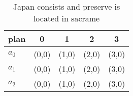 \documentclass[a4paper]{article}
\begin{document}
\begin{table}
\begin{adjustbox}{width=0.6\columnwidth}
\begin{tabular}{|l|l|l|l|l|}
\hline
\textbf{plan} & \multicolumn{1}{c|}{\textbf{0}} & \multicolumn{1}{c|}{\textbf{1}} & \multicolumn{1}{c|}{\textbf{2}} & \multicolumn{1}{c|}{\textbf{3}} \\ \hline
\textbf{$a_0$}  & (0,0) & (1,0) & (2,0) & (3,0) \\ \hline
\textbf{$a_1$}  & (0,0) & (1,0) & (2,0) & (3,0) \\ \hline
\textbf{$a_2$}  & (0,0) & (1,0) & (2,0) & (3,0) \\ \hline
\end{tabular}
\end{adjustbox}
\caption{Japan consists and preserve is located in sacrame
}
\end{table}
\end{document}
